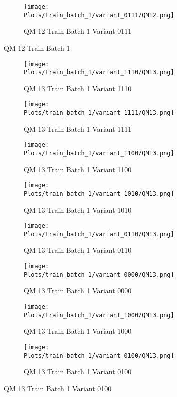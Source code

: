\documentclass{DissertateFigs}
\begin{document}
\begin{figure}[t!]
\medskip

    \begin{subfigure}{0.47\textwidth}
    \texttt{[image: Plots/train\_batch\_1/variant\_0111/QM12.png]}
    \caption{QM 12 Train Batch 1 Variant 0111}
    \end{subfigure}
\caption{QM 12 Train Batch 1}
    \end{figure}
\clearpage
\begin{figure}[t!]
    \begin{subfigure}{0.47\textwidth}
    \texttt{[image: Plots/train\_batch\_1/variant\_1110/QM13.png]}
    \caption{QM 13 Train Batch 1 Variant 1110}
    \end{subfigure}
    \begin{subfigure}{0.47\textwidth}
    \texttt{[image: Plots/train\_batch\_1/variant\_1111/QM13.png]}
    \caption{QM 13 Train Batch 1 Variant 1111}
    \end{subfigure}

\medskip

    \begin{subfigure}{0.47\textwidth}
    \texttt{[image: Plots/train\_batch\_1/variant\_1100/QM13.png]}
    \caption{QM 13 Train Batch 1 Variant 1100}
    \end{subfigure}
    \begin{subfigure}{0.47\textwidth}
    \texttt{[image: Plots/train\_batch\_1/variant\_1010/QM13.png]}
    \caption{QM 13 Train Batch 1 Variant 1010}
    \end{subfigure}

\medskip

    \begin{subfigure}{0.47\textwidth}
    \texttt{[image: Plots/train\_batch\_1/variant\_0110/QM13.png]}
    \caption{QM 13 Train Batch 1 Variant 0110}
    \end{subfigure}
    \begin{subfigure}{0.47\textwidth}
    \texttt{[image: Plots/train\_batch\_1/variant\_0000/QM13.png]}
    \caption{QM 13 Train Batch 1 Variant 0000}
    \end{subfigure}

\medskip

    \begin{subfigure}{0.47\textwidth}
    \texttt{[image: Plots/train\_batch\_1/variant\_1000/QM13.png]}
    \caption{QM 13 Train Batch 1 Variant 1000}
    \end{subfigure}
    \begin{subfigure}{0.47\textwidth}
    \texttt{[image: Plots/train\_batch\_1/variant\_0100/QM13.png]}
    \caption{QM 13 Train Batch 1 Variant 0100}
    \end{subfigure}


\end{figure}
\end{document}
